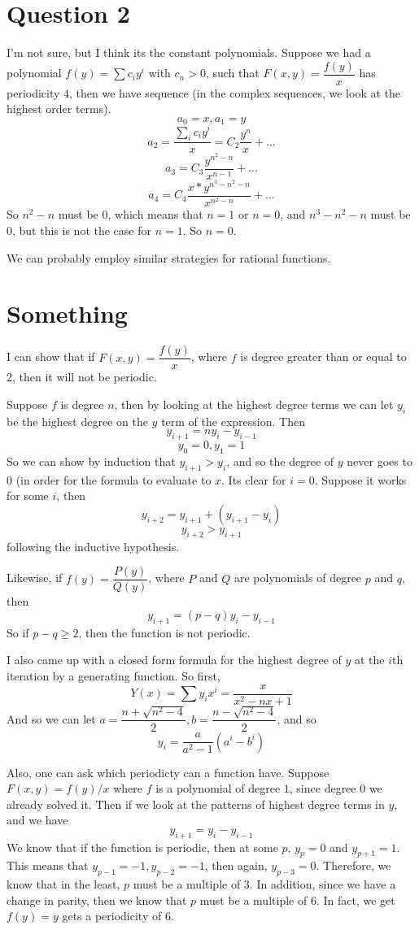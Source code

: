\documentclass[12pt]{article}
\begin{document}
\section{Question 2}

I'm not sure, but I think its the constant polynomials. Suppose we had a polynomial $f(y) = \sum c_iy^i$ with $c_n > 0$, such that $F(x,y) = \dfrac{f(y)}{x}$ has periodicity $4$, then we have sequence (in the complex sequences, we look at the highest order terms).
\[ a_0 = x, a_1 = y \]
\[ a_2 = \dfrac{\sum_i c_i y^i}{x} = C_2\frac{y^n}{x} + ... \]
\[ a_3 = C_3 \frac{y^{n^2-n}}{x^{n-1}} + ...\]
\[ a_4 = C_4 \dfrac{x*y^{n^3-n^2-n}}{x^{n^2 - n}} + ...\]
So $n^2 - n$ must be 0, which means that $n = 1$ or $n=0$, and $n^3 - n^2 - n$ must be 0, but this is not the case for $n = 1$. So $n=0$. 

We can probably employ similar strategies for rational functions.

\section{Something}

I can show that if $F(x,y) = \dfrac{f(y)}{x}$, where $f$ is degree greater than or equal to 2, then it will not be periodic. 

Suppose $f$ is degree $n$, then by looking at the highest degree terms we can let $y_i$ be the highest degree on the $y$ term of the expression. Then
\[ y_{i+1} = ny_{i} - y_{i-1} \]
\[ y_0 = 0, y_1 = 1 \]
So we can show by induction that $y_{i+1} > y_i$, and so the degree of $y$ never goes to 0 (in order for the formula to evaluate to $x$. Its clear for $i = 0$. Suppose it works for some $i$, then 
\[ y_{i+2} = y_{i+1} + (y_{i+1} - y_{i}) \]
\[ y_{i+2} > y_{i+1} \]
following the inductive hypothesis.

Likewise, if $f(y) = \dfrac{P(y)}{Q(y)}$, where $P$ and $Q$ are polynomials of degree $p$ and $q$, then
\[ y_{i+1} = (p-q)y_{i} - y_{i-1} \]
So if $p - q \geq 2$, then the function is not periodic.

I also came up with a closed form formula for the highest degree of $y$ at the $i$th iteration by a generating function. 
So first, 
\[ Y(x) = \sum y_ix^i = \dfrac{x}{x^2 - nx + 1} \]
And so we can let $a = \dfrac{n + \sqrt{n^2 - 4}}{2}, b = \dfrac{n - \sqrt{n^2-4}}{2}$, and so 
\[ y_i = \dfrac{a}{a^2 - 1}(a^i - b^i) \]

Also, one can ask which periodicty can a function have. Suppose $F(x,y) = f(y)/x$ where $f$ is a polynomial of degree $1$, since degree $0$ we already solved it. Then if we look at the patterns of highest degree terms in $y$, and we have 
\[ y_{i+1} = y_i - y_{i-1} \]
We know that if the function is periodic, then at some $p$, $y_p = 0$ and $y_{p+1} = 1$. This means that $y_{p-1} = -1, y_{p-2} = -1$, then again, $y_{p-3} = 0$. Therefore, we know that in the least, $p$ must be a multiple of $3$. In addition, since we have a change in parity, then we know that $p$ must be a multiple of $6$. In fact, we get $f(y) = y$ gets a periodicity of $6$. 
\end{document}
